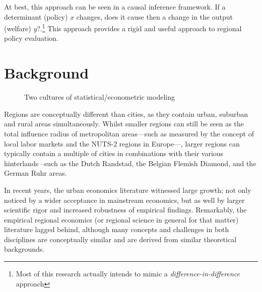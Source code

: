\documentclass[fleqn,10pt]{SelfArx} %
\begin{document}
At best, this approach can be seen in a causal inference framework. If a determinant (policy) $x$ changes, does it cause then a change in the output (welfare) $y$?.\footnote{Most of this research actually intends to mimic a \textit{difference-in-difference} approach} This approach provides a rigid  and useful approach to regional policy evaluation. 


\section{Background\label{Background}}

\begin{figure}[ht!]\centering 
	\hfill
	
	\caption{Two cultures of statistical/econometric modeling \citep[inspired by][]{breiman2001statistical}}
	\label{fig:twocultures}
\end{figure}

Regions are conceptually different than cities, as they contain urban, suburban and rural areas simultaneously. Whilst smaller regions can still be seen as the total influence radius of metropolitan areas---such as measured by the concept of local labor markets and the NUTS-2 regions in Europe---, larger regions can typically contain a multiple of cities in combinations with their various hinterlands --such as the Dutch Randstad, the Belgian Flemish Diamond, and the German Ruhr areas. 

In recent years, the urban economics literature witnessed large growth; not only noticed by a wider acceptance in mainstream economics, but as well by larger scientific rigor and increased robustness of empirical findings. Remarkably, the empirical regional economics (or regional science in general for that matter) literature lagged behind, although many concepts and challenges in both disciplines are conceptually similar and are derived from similar theoretical backgrounds. 
\end{document}
